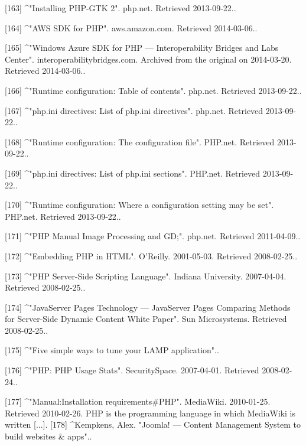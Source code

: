 [163]
^"Installing PHP-GTK 2". php.net. Retrieved 2013-09-22..

[164]
^"AWS SDK for PHP". aws.amazon.com. Retrieved 2014-03-06..

[165]
^"Windows Azure SDK for PHP — Interoperability Bridges and Labs Center". interoperabilitybridges.com. Archived from the original on 2014-03-20. Retrieved 2014-03-06..

[166]
^"Runtime configuration: Table of contents". php.net. Retrieved 2013-09-22..

[167]
^"php.ini directives: List of php.ini directives". php.net. Retrieved 2013-09-22..

[168]
^"Runtime configuration: The configuration file". PHP.net. Retrieved 2013-09-22..

[169]
^"php.ini directives: List of php.ini sections". PHP.net. Retrieved 2013-09-22..

[170]
^"Runtime configuration: Where a configuration setting may be set". PHP.net. 
Retrieved 2013-09-22..

[171]
^"PHP Manual Image Processing and GD;". php.net. Retrieved 2011-04-09..

[172]
^"Embedding PHP in HTML". O'Reilly. 2001-05-03. Retrieved 2008-02-25..

[173]
^"PHP Server-Side Scripting Language". Indiana University. 2007-04-04. Retrieved 2008-02-25..

[174]
^"JavaServer Pages Technology — JavaServer Pages Comparing Methods for Server-Side Dynamic Content White Paper". Sun Microsystems. Retrieved 2008-02-25..

[175]
^"Five simple ways to tune your LAMP application"..

[176]
^"PHP: PHP Usage Stats". SecuritySpace. 2007-04-01. Retrieved 2008-02-24..

[177]
^"Manual:Installation requirements#PHP". MediaWiki. 2010-01-25. Retrieved 2010-02-26. PHP is the programming language in which MediaWiki is written [...].
[178]
^Kempkens, Alex. "Joomla! — Content Management System to build websites & apps"..

